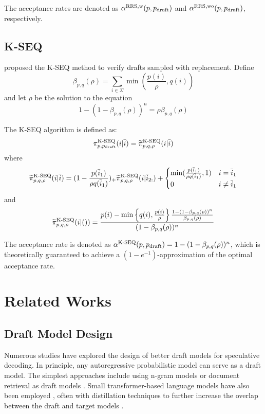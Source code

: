 \documentclass{article}
\begin{document}
The acceptance rates are denoted as $\alpha^{\operatorname{RRS},\operatorname{w}}(p,p_{\operatorname{draft}})$ and $\alpha^{\operatorname{RRS},\operatorname{wo}}(p,p_{\operatorname{draft}})$, respectively.

\subsection{K-SEQ}\label{se:kseq}
\citet{sun2024spectr} proposed the K-SEQ method to verify drafts sampled with replacement. Define
\begin{equation}
\beta_{p,q}(\rho)=\sum_{i\in\Sigma}\min(\frac{p(i)}{\rho},q(i))
\end{equation}
and let $\rho$ be the solution to the equation
\begin{equation}
1-(1-\beta_{p,q}(\rho))^n=\rho\beta_{p,q}(\rho)
\end{equation}

The K-SEQ algorithm is defined as:
\begin{equation}
\pi^{\operatorname{K-SEQ}}_{p,p_{\operatorname{draft}}}(i|\bar{i})=\widetilde{\pi}^{\operatorname{K-SEQ}}_{p,q,\rho}(i|\bar{i})
\end{equation}
where
\begin{equation}
\widetilde{\pi}^{\operatorname{K-SEQ}}_{p,q,\rho}(i|\bar{i})=
(1-\frac{p(\bar{i}_1)}{\rho q(\bar{i}_1)})_+
\widetilde{\pi}^{\operatorname{K-SEQ}}_{p,q,\rho}(i|\bar{i}_{2:})
+
\begin{cases}\min(\frac{p(\bar{i}_1)}{\rho q(\bar{i}_1)},1)&i=\bar{i}_1\\0&i\neq \bar{i}_1\end{cases}
\end{equation}
and
\begin{equation}
\widetilde{\pi}^{\operatorname{K-SEQ}}_{p,q,\rho}(i|())=\frac{p(i)-\min\left\{q(i),\frac{p(i)}\rho\right\}\frac{1-(1-\beta_{p,q}(\rho))^n}{\beta_{p,q}(\rho)}}{(1-\beta_{p,q}(\rho))^n}
\end{equation}

The acceptance rate is denoted as $\alpha^{\operatorname{K-SEQ}}(p,p_{\operatorname{draft}})=1-(1-\beta_{p,q}(\rho))^n$, which is theoretically guaranteed to achieve a $(1-e^{-1})$-approximation of the optimal acceptance rate. \section{Related Works}\label{se:related_work}
\subsection{Draft Model Design}
Numerous studies have explored the design of better draft models for speculative decoding. In principle, any autoregressive probabilistic model can serve as a draft model. The simplest approaches include using n-gram models \citep{ou2024lossless} or document retrieval as draft models \citep{yang2023inference,he2023rest}. Small transformer-based language models have also been employed \citep{leviathan2023fast,chen2023accelerating}, often with distillation techniques to further increase the overlap between the draft and target models \citep{zhou2023distillspec}.
\end{document}
